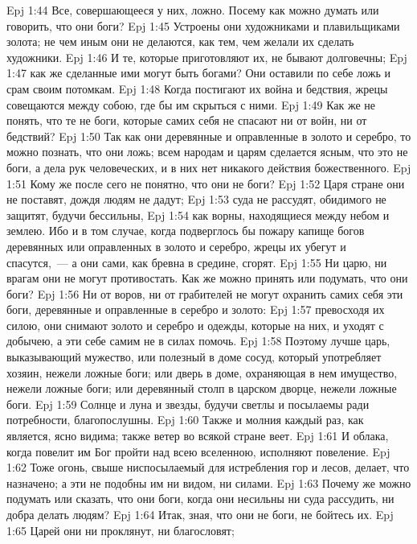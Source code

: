 \vs Epj 1:44 Все, совершающееся у них, ложно. Посему как можно думать или говорить, что они боги?
\vs Epj 1:45 Устроены они художниками и плавильщиками золота; не чем иным они не делаются, как тем, чем желали их сделать художники.
\vs Epj 1:46 И те, которые приготовляют их, не бывают долговечны;
\vs Epj 1:47 как же сделанные ими могут быть богами? Они оставили по себе ложь и срам своим потомкам.
\vs Epj 1:48 Когда постигают их война и бедствия, жрецы совещаются между собою, где бы им скрыться с ними.
\vs Epj 1:49 Как же не понять, что те не боги, которые самих себя не спасают ни от войн, ни от бедствий?
\vs Epj 1:50 Так как они деревянные и оправленные в золото и серебро, то можно познать, что они ложь; всем народам и царям сделается ясным, что это не боги, а дела рук человеческих, и в них нет никакого действия божественного.
\vs Epj 1:51 Кому же после сего не понятно, что они не боги?
\vs Epj 1:52 Царя стране они не поставят, дождя людям не дадут;
\vs Epj 1:53 суда не рассудят, обидимого не защитят, будучи бессильны,
\vs Epj 1:54 как ворны, находящиеся между небом и землею. Ибо и в том случае, когда подверглось бы пожару капище богов деревянных или оправленных в золото и серебро, жрецы их убегут и спасутся,~--- а они сами, как бревна в средине, сгорят.
\vs Epj 1:55 Ни царю, ни врагам они не могут противостать. Как же можно принять или подумать, что они боги?
\vs Epj 1:56 Ни от воров, ни от грабителей не могут охранить самих себя эти боги, деревянные и оправленные в серебро и золото:
\vs Epj 1:57 превосходя их силою, они снимают золото и серебро и одежды, которые на них, и уходят с добычею, а эти себе самим не в силах помочь.
\vs Epj 1:58 Поэтому лучше царь, выказывающий мужество, или полезный в доме сосуд, который употребляет хозяин, нежели ложные боги; или  дверь в доме, охраняющая в нем имущество, нежели ложные боги; или  деревянный столп в царском дворце, нежели ложные боги.
\vs Epj 1:59 Солнце и луна и звезды, будучи светлы и посылаемы ради потребности, благопослушны.
\vs Epj 1:60 Также и молния каждый раз, как является, ясно видима; также ветер во всякой стране веет.
\vs Epj 1:61 И облака, когда повелит им Бог пройти над всею вселенною, исполняют повеление.
\vs Epj 1:62 Тоже огонь, свыше ниспосылаемый для истребления гор и лесов, делает, что назначено; а эти не подобны им ни видом, ни силами.
\vs Epj 1:63 Почему же можно подумать или сказать, что они боги, когда они несильны ни суда рассудить, ни добра делать людям?
\vs Epj 1:64 Итак, зная, что они не боги, не бойтесь их.
\vs Epj 1:65 Царей они ни проклянут, ни благословят;
